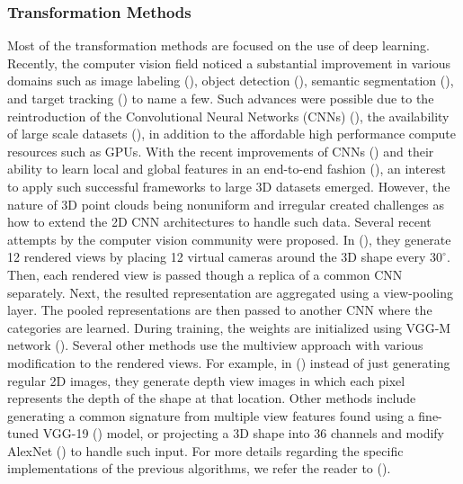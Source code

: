 \documentclass[final,3p,times,twocolumn,authoryear]{elsarticle}
\begin{document}
\subsubsection{Transformation Methods}
Most of the transformation methods are focused on the use of deep learning. Recently, the computer vision field noticed a substantial improvement in various domains such as image labeling (\cite{Alex_NIPS2012}), object detection (\cite{RCNN2014}), semantic segmentation (\cite{Segnet_PAMI,FCN}), and target tracking (\cite{DLT,SPT}) to name a few. Such advances were possible due to the reintroduction of the Convolutional Neural Networks (CNNs) (\cite{LeCun1989b}), the availability of large scale datasets (\cite{imagenet}), in addition to the affordable high performance compute resources such as GPUs. With the recent improvements of CNNs (\cite{resnet}) and their ability to learn local and global features in an end-to-end fashion (\cite{deepvis}), an interest to apply such successful frameworks to large 3D datasets emerged. However, the nature of 3D point clouds being nonuniform and irregular created challenges as how to extend the 2D CNN architectures to handle such data. Several recent attempts by the computer vision community were proposed. In (\cite{MVCNN}), they generate 12 rendered views by placing 12 virtual cameras around the 3D shape every $30^{\circ}$. Then, each rendered view is passed though a replica of a common CNN separately. Next, the resulted representation are aggregated using a view-pooling layer. The pooled representations are then passed to another CNN where the categories are learned. During training, the weights are initialized using VGG-M network (\cite{vggm}). Several other methods use the multiview approach with various modification to the rendered views. For example, in (\cite{GIFT}) instead of just generating regular 2D images, they generate depth view images in which each pixel represents the depth of the shape at that location. Other methods include generating a  common signature from multiple view features found using a fine-tuned VGG-19 (\cite{Simonyan15}) model, or projecting a 3D shape into 36 channels and modify AlexNet (\cite{Alex_NIPS2012}) to handle such input. For more details regarding the specific implementations of the previous algorithms, we refer the reader to (\cite{shrec}). %
\end{document}
